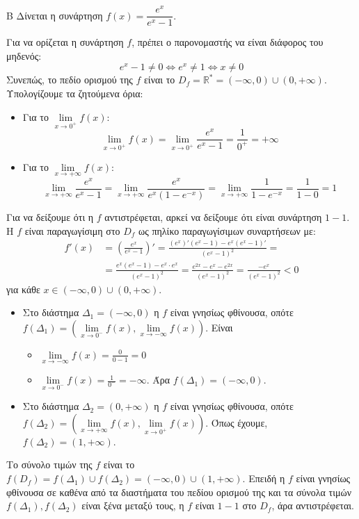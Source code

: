 \begin{thema}{Β}
Δίνεται η συνάρτηση $f(x) = \dfrac{e^x}{e^x-1}$.

\begin{erwthma}
\item Για να ορίζεται η συνάρτηση $f$, πρέπει ο παρονομαστής να είναι διάφορος του μηδενός:
\[ e^x - 1 \neq 0 \Leftrightarrow e^x \neq 1 \Leftrightarrow x \neq 0 \]
Συνεπώς, το πεδίο ορισμού της $f$ είναι το $D_f = \mathbb{R}^* = (-\infty, 0) \cup (0, +\infty)$. Υπολογίζουμε τα ζητούμενα όρια:
\begin{itemize}
    \item Για το $\lim\limits_{x \to 0^+} f(x)$:
    \[\lim\limits_{x \to 0^+} f(x) = \lim\limits_{x \to 0^+} \frac{e^x}{e^x-1} = \frac{1}{0^+} = +\infty\]
    \item Για το $\lim\limits_{x \to +\infty} f(x)$:
    \[ \lim_{x \to +\infty} \frac{e^x}{e^x-1} = \lim_{x \to +\infty} \frac{e^x}{e^x(1-e^{-x})} = \lim_{x \to +\infty} \frac{1}{1-e^{-x}} = \frac{1}{1-0} = 1 \]
\end{itemize}

\item Για να δείξουμε ότι η $f$ αντιστρέφεται, αρκεί να δείξουμε ότι είναι συνάρτηση $1-1$. Η $f$ είναι παραγωγίσιμη στο $D_f$ ως πηλίκο παραγωγίσιμων συναρτήσεων με:
\begin{align*}
f'(x) &= \left( \frac{e^x}{e^x-1} \right)' = \frac{(e^x)'(e^x-1) - e^x(e^x-1)'}{(e^x-1)^2} =\\&= \frac{e^x(e^x-1) - e^x \cdot e^x}{(e^x-1)^2} = \frac{e^{2x} - e^x - e^{2x}}{(e^x-1)^2} = \frac{-e^x}{(e^x-1)^2}<0
\end{align*}
για κάθε $x \in (-\infty, 0) \cup (0, +\infty)$.
\begin{itemize}
    \item Στο διάστημα $\Delta_1 = (-\infty, 0)$ η $f$ είναι γνησίως φθίνουσα, οπότε $f(\Delta_1) = \left(\lim\limits_{x \to 0^-} f(x), \lim\limits_{x \to -\infty} f(x)\right)$. Είναι 
\begin{itemize}[label=\tiny\faPlay]
\item $\lim\limits_{x \to -\infty} f(x) = \frac{0}{0-1} = 0$
\item $\lim\limits_{x \to 0^-} f(x) = \frac{1}{0^-} = -\infty$. Άρα $f(\Delta_1) = (-\infty, 0)$.
\end{itemize}
\item Στο διάστημα $\Delta_2 = (0, +\infty)$ η $f$ είναι γνησίως φθίνουσα, οπότε $f(\Delta_2) = \left(\lim\limits_{x \to +\infty} f(x), \lim\limits_{x \to 0^+} f(x)\right)$. Όπως έχουμε, $f(\Delta_2) = (1, +\infty)$.
\end{itemize}
Το σύνολο τιμών της $f$ είναι το $f(D_f) = f(\Delta_1) \cup f(\Delta_2) = (-\infty, 0) \cup (1, +\infty)$.
Επειδή η $f$ είναι γνησίως φθίνουσα σε καθένα από τα διαστήματα του πεδίου ορισμού της και τα σύνολα τιμών $f(\Delta_1), f(\Delta_2)$ είναι ξένα μεταξύ τους, η $f$ είναι $1-1$ στο $D_f$, άρα αντιστρέφεται.


\end{erwthma}
\end{thema}
